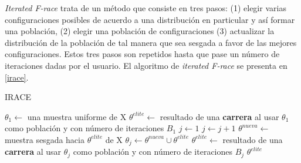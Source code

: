 \emph{Iterated F-race} trata de un método que consiste en tres pasos: (1) elegir varias configuraciones posibles de acuerdo a una distribución en particular y así formar una población, (2) elegir una población de configuraciones (3) actualizar la distribución de la población de tal manera que sea sesgada a favor de las mejores configuraciones. Estos tres pasos son repetidos hasta que pase un número de iteraciones dadas por el usuario. El algoritmo de \emph{iterated F-race} se presenta en \ref{irace}.

\begin{algorithm}
\caption{IRACE}
\label{irace}
\begin{algorithmic}[1]


\State $\theta_1 \gets$ una muestra uniforme de X
\State $\theta^{elite} \gets$ resultado de una \textbf{carrera} al usar $\theta_1$ como población y con número de iteraciones $B_1$
\State $j \gets 1$
	\State $j \gets j + 1$
	\State $\theta^{nueva} \gets$ muestra sesgada hacia $\theta^{elite}$ de X 
	\State $\theta_j \gets \theta^{nueva} \cup \theta^{elite}$
	\State $\theta^{elite} \gets$ resultado de una \textbf{carrera} al usar $\theta_j$ como población y con número de iteraciones $B_j$
\EndWhile
\State \Return $\theta^{elite}$

\end{algorithmic}
\end{algorithm}


